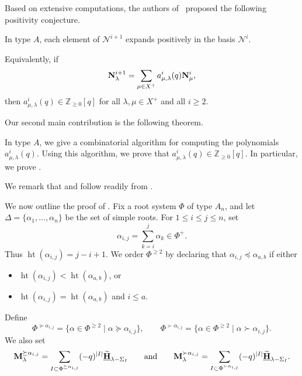 Based on extensive computations, the authors of~\cite{LPP} proposed the following positivity conjecture.

\begin{introconjecture}   \label{Conj A}
    In type $A$, each element of $\mathcal{N}^{i+1}$ expands positively in the basis $\mathcal{N}^i$.
    
    Equivalently, if
    \begin{equation}
        \mathbf{N}_{\lambda}^{i+1} =\sum_{\mu\in X^+} a_{\mu , \lambda}^i (q)  \mathbf{N}_{\mu}^i,
    \end{equation}
    then $a_{\mu , \lambda}^i(q)\in\mathbb{Z}_{\geq 0}[q]$ for all $\lambda,\mu\in X^+$ and all $i\geq 2$.
\end{introconjecture}

Our second main contribution is the following theorem.

\begin{introtheorem} \label{Teo C}
    In type $A$, we give a combinatorial algorithm for computing the polynomials $a_{\mu , \lambda}^i(q)$. Using this algorithm, we prove that $a_{\mu , \lambda}^i(q)\in\mathbb{Z}_{\geq 0}[q]$. In particular, we prove .
\end{introtheorem}

We remark that  and  follow readily from .

We now outline the proof of . Fix a root system $\Phi$ of type $A_n$, and let $\Delta=\{\alpha_1,\ldots,\alpha_n\}$ be the set of simple roots. For $1\leq i\leq j\leq n$, set
\begin{equation}
     \alpha_{i,j} =\sum_{k=i}^j \alpha_k \in \Phi^+.
\end{equation}
Thus $\operatorname{ht}(\alpha_{i,j})=j-i+1$. We order $\Phi^{\geq 2}$ by declaring that $\alpha_{i,j}\preceq \alpha_{a,b}$ if either
\begin{itemize}
    \item $\operatorname{ht}(\alpha_{i,j})<\operatorname{ht}(\alpha_{a,b})$, or
    \item $\operatorname{ht}(\alpha_{i,j})=\operatorname{ht}(\alpha_{a,b})$ and $i\leq a$.
\end{itemize}

Define
\[
    \Phi^{\succeq \alpha_{i,j}}=\{\alpha\in\Phi^{\geq 2}\mid \alpha\succeq \alpha_{i,j}\},
    \qquad
    \Phi^{\succ \alpha_{i,j}}=\{\alpha\in\Phi^{\geq 2}\mid \alpha\succ \alpha_{i,j}\}.
\]
We also set
\begin{equation}
    \mathbf{M}_{\lambda}^{\succeq \alpha_{i,j}}  =  \sum_{I\subset \Phi^{\succeq \alpha_{i,j} }} (-q)^{|I|} \widetilde{\underline{\mathbf{H}}}_{\lambda - \Sigma_I} 
    \qquad \mbox{and} \qquad 
    \mathbf{M}_{\lambda}^{\succ \alpha_{i,j}}  =  \sum_{I\subset \Phi^{\succ \alpha_{i,j} }} (-q)^{|I|} \widetilde{\underline{\mathbf{H}}}_{\lambda - \Sigma_I}.
\end{equation}

